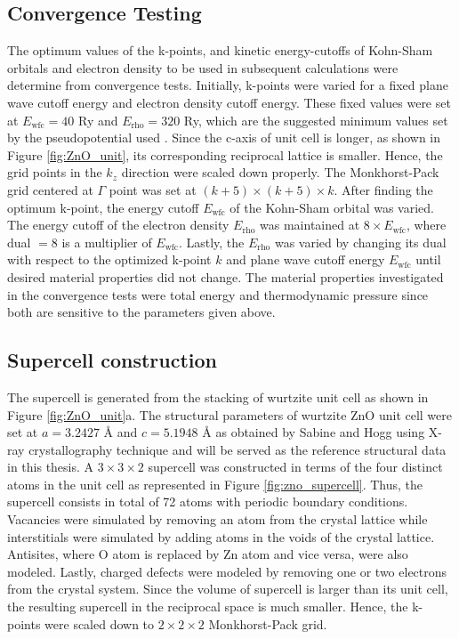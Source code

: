 \subsection{Convergence Testing}
The optimum values of the k-points, and kinetic energy-cutoffs  of  Kohn-Sham orbitals and electron density to be used in subsequent calculations were determine from convergence tests. Initially, k-points were varied for a fixed plane wave cutoff energy and electron density cutoff energy. These fixed values were set at $E_{\text{wfc}} = 40$ Ry and $E_{\text{rho}} = 320$ Ry, which are the suggested minimum values set by the pseudopotential used \citep{Garrity2014}.  Since the c-axis of  unit cell is longer, as shown in Figure \ref{fig:ZnO_unit}, its corresponding reciprocal lattice is smaller. Hence, the grid points in the $k_z$ direction were scaled down properly. The Monkhorst-Pack grid centered at $\Gamma$ point was set at $(k+5) \times (k +5 ) \times k$. After finding the optimum k-point, the energy cutoff $E_{\text{wfc}}$ of the Kohn-Sham orbital was varied. The energy cutoff of the electron density $E_{\text{rho}}$ was maintained at $8 \times E_{\text{wfc}}$, where dual $=8$ is a multiplier of $E_{\text{wfc}}$. Lastly, the $E_{\text{rho}}$ was varied by changing its dual with respect to the optimized k-point $k$ and plane wave cutoff energy $E_{\text{wfc}}$ until desired material properties did not change. The material properties investigated in the convergence tests were total energy and thermodynamic pressure since both are sensitive to the parameters given above.

\subsection{Supercell construction}
The supercell is generated from the stacking of wurtzite  unit cell as  shown in Figure \ref{fig:ZnO_unit}a. The structural parameters of wurtzite ZnO unit cell were set at $a=3.2427 $ {\AA} and $c = 5.1948 $ {\AA} as obtained by Sabine and Hogg \citep{Sabine1969}  using X-ray crystallography technique and will be served as the reference structural data in this thesis. A $3 \times 3 \times 2$ supercell was constructed  in terms of the four distinct atoms in the unit cell as represented in Figure \ref{fig:zno_supercell}. Thus, the supercell consists in total of 72 atoms with periodic boundary conditions. Vacancies were simulated by removing an atom from the crystal lattice while interstitials were simulated by adding atoms in the voids of the crystal lattice. Antisites, where O atom is replaced by Zn atom and vice versa, were also modeled. Lastly, charged defects were modeled by removing one or two electrons from the crystal system. Since the volume of supercell is larger than its unit cell, the resulting supercell in the reciprocal space is much smaller. Hence, the k-points were scaled down to $2 \times 2 \times 2$ Monkhorst-Pack grid.

